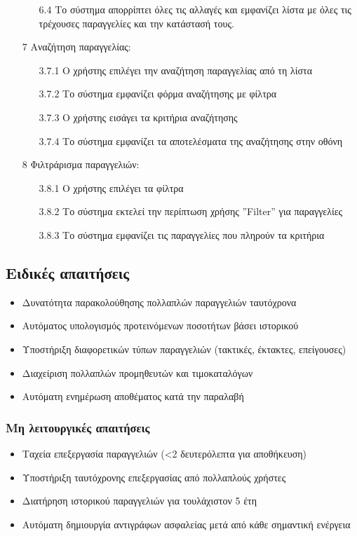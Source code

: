 \documentclass[12pt,a4paper,twoside]{book}
\begin{document}
\begin{enumerate}
\begin{enumerate}
          \item[6.4 ] Το σύστημα απορρίπτει όλες τις αλλαγές και εμφανίζει λίστα με όλες τις τρέχουσες παραγγελίες και την κατάστασή τους.
        \end{enumerate}
  \item[7 ] Αναζήτηση παραγγελίας:
        \begin{enumerate}
          \item[3.7.1 ] Ο χρήστης επιλέγει την αναζήτηση παραγγελίας από τη λίστα
          \item[3.7.2 ] Το σύστημα εμφανίζει φόρμα αναζήτησης με φίλτρα %
          \item[3.7.3 ] Ο χρήστης εισάγει τα κριτήρια αναζήτησης
          \item[3.7.4 ] Το σύστημα εμφανίζει τα αποτελέσματα της αναζήτησης στην οθόνη
        \end{enumerate}
  \item[8 ] Φιλτράρισμα παραγγελιών:
        \begin{enumerate}
          \item[3.8.1 ] Ο χρήστης επιλέγει τα φίλτρα %
          \item[3.8.2 ] Το σύστημα εκτελεί την περίπτωση χρήσης ”Filter” για παραγγελίες
          \item[3.8.3 ] Το σύστημα εμφανίζει τις παραγγελίες που πληρούν τα κριτήρια
        \end{enumerate}
\end{enumerate}

\subsection{Ειδικές απαιτήσεις} %
\begin{itemize}
  \item Δυνατότητα παρακολούθησης πολλαπλών παραγγελιών ταυτόχρονα
  \item Αυτόματος υπολογισμός προτεινόμενων ποσοτήτων βάσει ιστορικού
  \item Υποστήριξη διαφορετικών τύπων παραγγελιών (τακτικές, έκτακτες, επείγουσες) %
  \item Διαχείριση πολλαπλών προμηθευτών και τιμοκαταλόγων
  \item Αυτόματη ενημέρωση αποθέματος κατά την παραλαβή
\end{itemize}

\subsubsection{Μη λειτουργικές απαιτήσεις}
\begin{itemize}
  \item Ταχεία επεξεργασία παραγγελιών (<2 δευτερόλεπτα για αποθήκευση) %
  \item Υποστήριξη ταυτόχρονης επεξεργασίας από πολλαπλούς χρήστες
  \item Διατήρηση ιστορικού παραγγελιών για τουλάχιστον 5 έτη
  \item Αυτόματη δημιουργία αντιγράφων ασφαλείας μετά από κάθε σημαντική ενέργεια %
\end{itemize}
\end{document}
